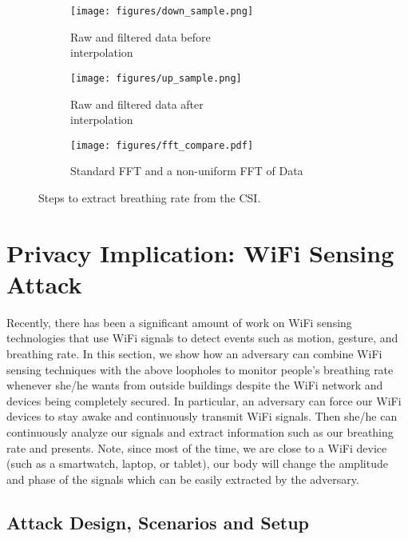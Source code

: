 

\begin{figure*}[th!]
    \centering
    \begin{subfigure}[b]{0.329\textwidth}
        \centering 
        \texttt{[image: figures/down\_sample.png]}
        \caption{Raw and filtered data before \\ interpolation}
    \end{subfigure}
    \begin{subfigure}[b]{0.329\textwidth}
        \centering
        \texttt{[image: figures/up\_sample.png]}
        \caption{Raw and filtered data after \\ interpolation}
    \end{subfigure}
        \begin{subfigure}[b]{0.328\textwidth}
        \centering
        \texttt{[image: figures/fft\_compare.pdf]}
        \caption{Standard FFT and a non-uniform FFT of Data}
    \end{subfigure}
    \caption{Steps to extract breathing rate from the CSI.}
    \label{fig:process-step}
\end{figure*}

\section{Privacy Implication: WiFi Sensing Attack}\label{sec:implications}

Recently, there has been a significant amount of work on WiFi sensing technologies that use WiFi signals to detect events such as motion, gesture, and breathing rate. In this section, we show how an adversary can combine WiFi sensing techniques with the above loopholes to monitor people's breathing rate whenever she/he wants from outside buildings despite the WiFi network and devices being completely secured. In particular, an adversary can force our WiFi devices to stay awake and continuously transmit WiFi signals. Then she/he can continuously analyze our signals and extract information such as our breathing rate and presents. Note, since most of the time, we are close to a WiFi device (such as a smartwatch, laptop, or tablet), our body will change the amplitude and phase of the signals which can be easily extracted by the adversary.


\subsection{Attack Design, Scenarios and Setup}

